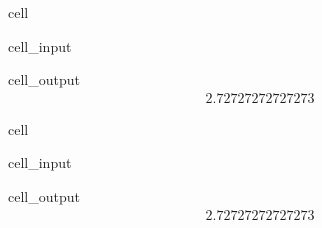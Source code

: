 \documentclass[letterpaper,10pt,english]{jupyterBook}
\begin{document}
\begin{sphinxuseclass}{cell}\begin{sphinxVerbatimInput}

\begin{sphinxuseclass}{cell_input}
\begin{sphinxVerbatim}[commandchars=\\\{\}]
\end{sphinxVerbatim}

\end{sphinxuseclass}\end{sphinxVerbatimInput}
\begin{sphinxVerbatimOutput}

\begin{sphinxuseclass}{cell_output}\begin{equation*}
\begin{split}2.72727272727273\end{split}
\end{equation*}
\end{sphinxuseclass}\end{sphinxVerbatimOutput}

\end{sphinxuseclass}
\begin{sphinxuseclass}{cell}\begin{sphinxVerbatimInput}

\begin{sphinxuseclass}{cell_input}
\begin{sphinxVerbatim}[commandchars=\\\{\}]
\end{sphinxVerbatim}

\end{sphinxuseclass}\end{sphinxVerbatimInput}
\begin{sphinxVerbatimOutput}

\begin{sphinxuseclass}{cell_output}\begin{equation*}
\begin{split}2.72727272727273\end{split}
\end{equation*}
\end{sphinxuseclass}\end{sphinxVerbatimOutput}

\end{sphinxuseclass}
\end{document}

